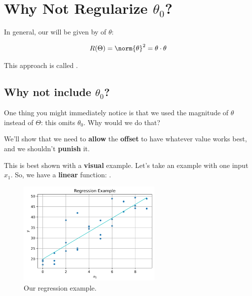 \section*{Why Not Regularize $\theta_0$?}
        
        \begin{kequation}
            In general, our  will be given by  of $\theta$:
            
            \begin{equation*}
                R(\Theta) = \norm{\theta}^2 = \theta \cdot \theta
            \end{equation*}
            
            This approach is called .
        \end{kequation}
        
        
    \subsection*{Why not include $\theta_0$?}
    
        One thing you might immediately notice is that we used the magnitude of $\theta$ instead of $\Theta$: this omits $\theta_0$. Why would we do that?
        
        We'll show that we need to \textbf{allow} the \textbf{offset} to have whatever value works best, and we shouldn't \textbf{punish} it. 
        
        This is best shown with a \textbf{visual} example. Let's take an example with one input $x_1$. So, we have a \textbf{linear} function: .
        
        \begin{figure}[H]
        \centering
            \includegraphics[width=70mm,scale=0.5]{images/regression_images/Regression_Keep_Offset.png}
        
            \caption*{Our regression example.}
        \end{figure}
        
